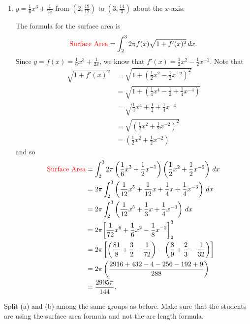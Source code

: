 \documentclass[noinstructornotes]{ximera}
\begin{document}
\begin{problem}
\begin{enumerate}
	
		\item  $y = \frac{1}{6} x^3 + \frac{1}{2x}$ from $\left( 2, \frac{19}{12} \right)$ to $\left( 3, \frac{14}{3} \right)$ about the $x$-axis.
		\begin{freeResponse}
		The formula for the surface area is
			\[
			\text{{\color{red} Surface Area}} = \int_2^3 2 \pi f(x) \sqrt{1+f'(x)^2} \,d x.
			\]
		Since $y = f(x) = \frac{1}{6} x^3 + \frac{1}{2x}$, we know that $f'(x) = \frac{1}{2} x^2 - \frac{1}{2} x^{-2}$.  
		Note that
			\begin{align*}
			\sqrt{1+f'(x)^2} &= \sqrt{1+ \left( \frac{1}{2}x^2 - \frac{1}{2}x^{-2} \right)^2}  \\
			&= \sqrt{1+ \left( \frac{1}{4}x^4 - \frac{1}{2} + \frac{1}{4}x^{-4} \right)}  \\
			&= \sqrt{\frac{1}{4}x^4 + \frac{1}{2} + \frac{1}{4}x^{-4}}  \\
			&= \sqrt{\left( \frac{1}{2}x^2 + \frac{1}{2}x^{-2} \right)^2}  \\
			&= \left( \frac{1}{2}x^2 + \frac{1}{2}x^{-2} \right)
			\end{align*}
		and so
			\begin{align*}
			\text{{\color{red} Surface Area}} &= \int_2^3 2 \pi \left( \frac{1}{6} x^3 + \frac{1}{2} x^{-1} \right) \left( \frac{1}{2} x^2 + \frac{1}{2} x^{-2} \right) \,d x  \\
			&= 2 \pi \int_2^3 \left( \frac{1}{12} x^5 + \frac{1}{12} x + \frac{1}{4} x + \frac{1}{4} x^{-3} \right) \,d x  \\
			&= 2 \pi \int_2^3 \left( \frac{1}{12} x^5 + \frac{1}{3} x + \frac{1}{4} x^{-3} \right) \,d x  \\
			&= 2 \pi \bigg[ \frac{1}{72}x^6 + \frac{1}{6}x^2 - \frac{1}{8}x^{-2} \bigg]_2^3  \\
			&= 2\pi \left[ \left( \frac{81}{8} + \frac{3}{2} - \frac{1}{72} \right) - \left( \frac{8}{9} + \frac{2}{3} - \frac{1}{32} \right) \right]  \\
			&= 2\pi \left( \frac{2916 + 432 - 4 - 256 - 192 + 9}{288} \right)  \\
			&= \frac{2905 \pi}{144}.
			\end{align*}
		\end{freeResponse}
		
		
		

	\end{enumerate}
	
\end{problem}

\begin{instructorNotes}
Split (a) and (b) among the same groups as before.  
Make sure that the students are using the surface area formula and not the arc length formula.
\end{instructorNotes}
\end{document}
